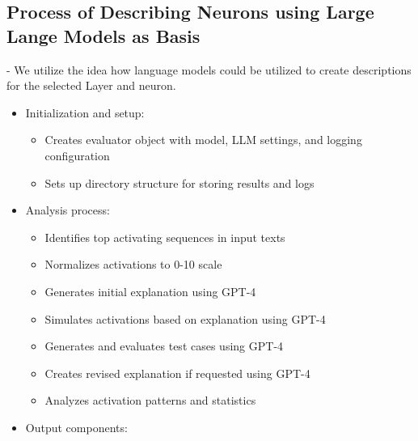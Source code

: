 \subsection{Process of Describing Neurons using Large Lange Models as Basis}

- We utilize the idea \cite{bills2023language} how language models could be utilized to create descriptions for the selected Layer and neuron. 
\begin{itemize}
    \item Initialization and setup:
    \begin{itemize}
        \item Creates evaluator object with model, LLM settings, and logging configuration
        \item Sets up directory structure for storing results and logs
    \end{itemize}
    \item Analysis process:
    \begin{itemize}
        \item Identifies top activating sequences in input texts
        \item Normalizes activations to 0-10 scale
        \item Generates initial explanation using GPT-4
        \item Simulates activations based on explanation using GPT-4
        \item Generates and evaluates test cases using GPT-4
        \item Creates revised explanation if requested using GPT-4
        \item Analyzes activation patterns and statistics
    \end{itemize}
    \item Output components:
\end{itemize}

